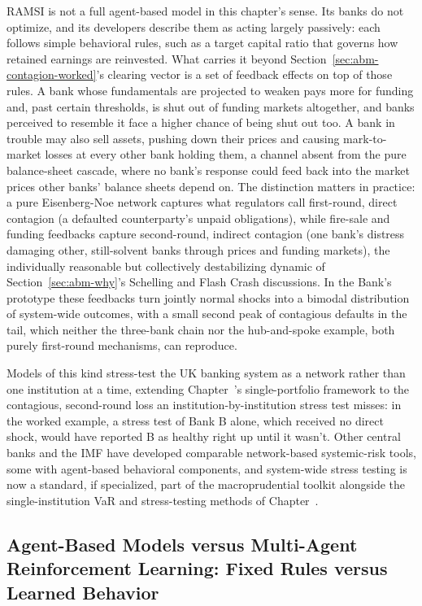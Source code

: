 \documentclass[../ai_in_finance]{subfiles}
\begin{document}
RAMSI is not a full agent-based model in this chapter's sense. Its banks do not optimize, and its developers describe them as acting largely passively: each follows simple behavioral rules, such as a target capital ratio that governs how retained earnings are reinvested. What carries it beyond Section~\ref{sec:abm-contagion-worked}'s clearing vector is a set of feedback effects on top of those rules. A bank whose fundamentals are projected to weaken pays more for funding and, past certain thresholds, is shut out of funding markets altogether, and banks perceived to resemble it face a higher chance of being shut out too. A bank in trouble may also sell assets, pushing down their prices and causing mark-to-market losses at every other bank holding them, a channel absent from the pure balance-sheet cascade, where no bank's response could feed back into the market prices other banks' balance sheets depend on. The distinction matters in practice: a pure Eisenberg-Noe network captures what regulators call first-round, direct contagion (a defaulted counterparty's unpaid obligations), while fire-sale and funding feedbacks capture second-round, indirect contagion (one bank's distress damaging other, still-solvent banks through prices and funding markets), the individually reasonable but collectively destabilizing dynamic of Section~\ref{sec:abm-why}'s Schelling and Flash Crash discussions. In the Bank's prototype these feedbacks turn jointly normal shocks into a bimodal distribution of system-wide outcomes, with a small second peak of contagious defaults in the tail, which neither the three-bank chain nor the hub-and-spoke example, both purely first-round mechanisms, can reproduce.

Models of this kind stress-test the UK banking system as a network rather than one institution at a time, extending Chapter~'s single-portfolio framework to the contagious, second-round loss an institution-by-institution stress test misses: in the worked example, a stress test of Bank B alone, which received no direct shock, would have reported B as healthy right up until it wasn't. Other central banks and the IMF have developed comparable network-based systemic-risk tools, some with agent-based behavioral components, and system-wide stress testing is now a standard, if specialized, part of the macroprudential toolkit alongside the single-institution VaR and stress-testing methods of Chapter~.

\subsection{Agent-Based Models versus Multi-Agent Reinforcement Learning: Fixed Rules versus Learned Behavior}
\label{sec:abm-vs-marl}
\end{document}
